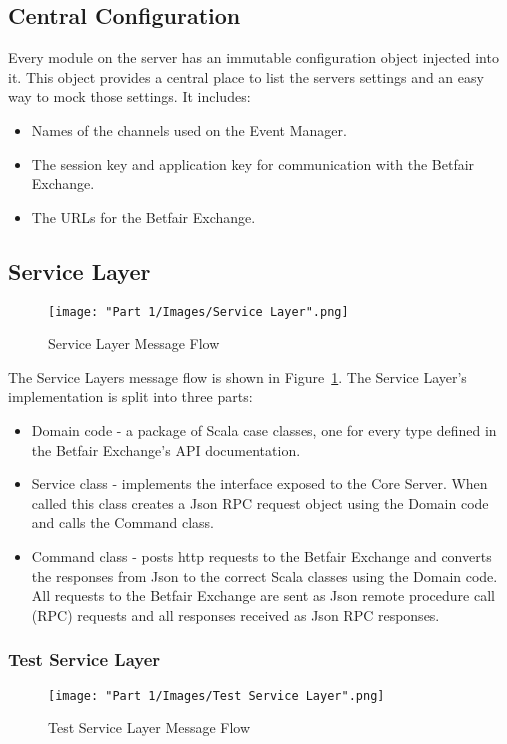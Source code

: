 	\subsection{Central Configuration}
	Every module on the server has an immutable configuration object injected into it. This object provides a central place to list the servers settings and an easy way to mock those settings. It includes: 
	
		\begin{itemize}
			\item Names of the channels used on the Event Manager.
			\item The session key and application key for communication with the Betfair Exchange.
			\item The URLs for the Betfair Exchange.
		\end{itemize}

	\subsection{Service Layer}
		\begin{figure}[H]
			\centering
			\texttt{[image: "Part 1/Images/Service Layer".png]}
			\caption{Service Layer Message Flow}
			\label{fig:serviceLayer}
		\end{figure}
			
	The Service Layers message flow is shown in Figure~\ref{fig:serviceLayer}. The Service Layer's implementation is split into three parts:
		\begin{itemize}
			\item Domain code - a package of Scala case classes, one for every type defined in the Betfair Exchange's API documentation\cite{betfairTypeDefinitions}.
			\item Service class - implements the interface exposed to the Core Server. When called this class creates a Json RPC request object using the Domain code and calls the Command class.
			\item Command class - posts http requests to the Betfair Exchange and converts the responses from Json to the correct Scala classes using the Domain code. All requests to the Betfair Exchange are sent as Json remote procedure call (RPC) requests and all responses received as Json RPC responses.
		\end{itemize}	
		
		\subsubsection{Test Service Layer}
		\begin{figure}[H]
			\centering		
			\texttt{[image: "Part 1/Images/Test Service Layer".png]}
			\caption{Test Service Layer Message Flow}
			\label{fig:testServiceLayer}
		\end{figure}
				
